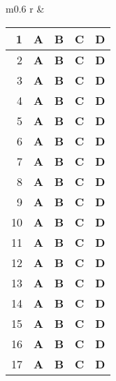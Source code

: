 \documentclass[letterpaper,12pt,addpoints]{exam}
\begin{document}
\begin{tabular}{m{} r}
& \begin{tabular}{| r | l | l | l | l |}
     \hline
     1 & \textbf{A} & \textbf{B} & \textbf{C} & \textbf{D} \\
     \hline
     2 & \textbf{A} & \textbf{B} & \textbf{C} & \textbf{D} \\
     \hline
     3 & \textbf{A} & \textbf{B} & \textbf{C} & \textbf{D} \\
     \hline
     4 & \textbf{A} & \textbf{B} & \textbf{C} & \textbf{D} \\
     \hline
     5 & \textbf{A} & \textbf{B} & \textbf{C} & \textbf{D} \\
     \hline
     6 & \textbf{A} & \textbf{B} & \textbf{C} & \textbf{D} \\
     \hline
     7 & \textbf{A} & \textbf{B} & \textbf{C} & \textbf{D} \\
     \hline
     8 & \textbf{A} & \textbf{B} & \textbf{C} & \textbf{D} \\
     \hline
     9 & \textbf{A} & \textbf{B} & \textbf{C} & \textbf{D} \\
     \hline
     10 & \textbf{A} & \textbf{B} & \textbf{C} & \textbf{D} \\
     \hline
     11 & \textbf{A} & \textbf{B} & \textbf{C} & \textbf{D} \\
     \hline
     12 & \textbf{A} & \textbf{B} & \textbf{C} & \textbf{D} \\
     \hline
     13 & \textbf{A} & \textbf{B} & \textbf{C} & \textbf{D} \\
     \hline
     14 & \textbf{A} & \textbf{B} & \textbf{C} & \textbf{D} \\
     \hline
     15 & \textbf{A} & \textbf{B} & \textbf{C} & \textbf{D} \\
     \hline
     16 & \textbf{A} & \textbf{B} & \textbf{C} & \textbf{D} \\
     \hline
     17 & \textbf{A} & \textbf{B} & \textbf{C} & \textbf{D} \\
     \hline
    \end{tabular}

\end{tabular}

\noindent %


\end{document}
